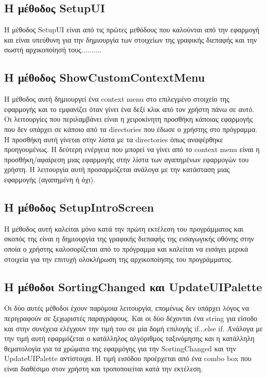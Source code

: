 \subsection{Η μέθοδος SetupUI}
Η μέθοδος SetupUI είναι από τις πρώτες μεθόδους που καλούνται από την εφαρμογή και
είναι υπεύθυνη για την δημιουργία των στοιχείων της γραφικής διεπαφής και την σωστή
αρχικοποίησή τους.......... 



\subsection{Η μέθοδος ShowCustomContextMenu}
Η μέθοδος αυτή δημιουργεί ένα context menu στο επιλεγμένο στοιχείο της εφαρμογής και
το εμφανίζει όταν γίνει ένα δεξί κλικ από τον χρήστη πάνω σε αυτό. Οι λειτουργίες που
περιλαμβάνει είναι η χειροκίνητη προσθήκη κάποιας εφαρμογής που δεν υπάρχει σε κάποιο
από τα directories που έδωσε ο χρήστης στο πρόγραμμα. Η προσθήκη αυτή γίνεται στην
λίστα με τα directories όπως αναφέρθηκε προηγουμένως. Η δεύτερη ενέργεια που μπορεί
να γίνει από το context menu είναι η προσθήκη/αφαίρεση μιας εφαρμογής στην λίστα των
αγαπημένων εφαρμογών του χρήστη. Η λειτουργία αυτή προσαρμόζεται ανάλογα με την κατάσταση
μιας εφαρμογής (αγαπημένη ή όχι).

\subsection{Η μέθοδος SetupIntroScreen}
Η μέθοδος αυτή καλείται μόνο κατά την πρώτη εκτέλεση του προγράμματος και σκοπός της
είναι η δημιουργία της γραφικής διεπαφής της εισαγωγικής οθόνης στην οποία ο χρήστης
καλοσορίζεται από το πρόγραμμα και καλείται να εισάγει μερικά στοιχεία για την επιτυχή
ολοκλήρωση της αρχικοποίησης του προγράμματος. 


\subsection{Η μέθοδοι SortingChanged και UpdateUIPalette}
Οι δύο αυτές μέθοδοι έχουν παρόμοια λειτουργία, επομένως δεν υπάρχει λόγος να περιγραφούν
σε ξεχωριστές παραγράφους. Και οι δύο δέχονται ένα string για είσοδο και στην συνέχεια
ελέγχουν την τιμή του σε μία δομή επιλογής if...else if. Άνάλογα με την τιμή αυτή εφαρμόζεται
ο κατάλληλος αλγόριθμος ταξινόμησης και η κατάλληλη θεματολογία για τα χρώματα της εφαρμόγης
για την SortingChanged και την UpdateUIPalette αντίστοιχα. Η τιμή εισόδου προέρχεται από
ένα combo box που είναι διαθέσιμο στον χρήστη και τροποποιείται κατά την εκτέλεση.





